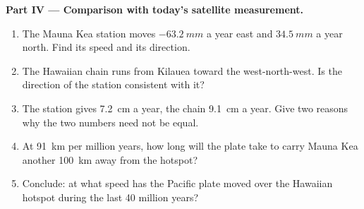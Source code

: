 \begin{problem}
\medskip
\noindent\textbf{Part IV --- Comparison with today's satellite measurement.}
\begin{enumerate}[resume]
  \item The Mauna Kea station moves $\qty{-63.2}{mm}$ a year east and
        $\qty{+34.5}{mm}$ a year north. Find its speed and its direction.
  \item The Hawaiian chain runs from Kilauea toward the west-north-west. Is
        the direction of the station consistent with it?
  \item The station gives \qty{7.2}{cm} a year, the chain \qty{9.1}{cm} a year.
        Give two reasons why the two numbers need not be equal.
  \item At \qty{91}{km} per million years, how long will the plate take to
        carry Mauna Kea another \qty{100}{km} away from the hotspot?
  \item Conclude: at what speed has the Pacific plate moved over the Hawaiian
        hotspot during the last 40 million years?
\end{enumerate}
\end{problem}
